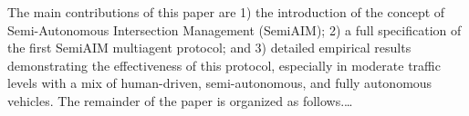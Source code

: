The main contributions of this paper are 1) the introduction of the
concept of Semi-Autonomous Intersection Management (SemiAIM); 2) a
full specification of the first SemiAIM multiagent protocol; and 3)
detailed empirical results demonstrating the effectiveness of this
protocol, especially in moderate traffic levels with a mix of
human-driven, semi-autonomous, and fully autonomous vehicles.  The
remainder of the paper is organized as follows.\ldots






